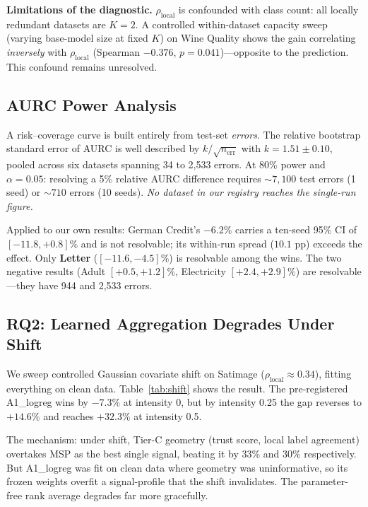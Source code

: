 \documentclass[conference]{IEEEtran}
\newcommand{\rholocal}{\rho_{\mathrm{local}}}
\begin{document}
\textbf{Limitations of the diagnostic.} $\rholocal$ is confounded with class count: all locally redundant datasets are $K{=}2$. A controlled within-dataset capacity sweep (varying base-model size at fixed $K$) on Wine Quality shows the gain correlating \emph{inversely} with $\rholocal$ (Spearman $-0.376$, $p=0.041$)---opposite to the prediction. This confound remains unresolved.

\subsection{AURC Power Analysis}
\label{sec:power}

A risk--coverage curve is built entirely from test-set \emph{errors}. The relative bootstrap standard error of AURC is well described by $k/\sqrt{n_{\mathrm{err}}}$ with $k = 1.51 \pm 0.10$, pooled across six datasets spanning 34 to 2{,}533 errors. At 80\% power and $\alpha{=}0.05$: resolving a 5\% relative AURC difference requires ${\sim}7{,}100$ test errors (1 seed) or ${\sim}710$ errors (10 seeds). \emph{No dataset in our registry reaches the single-run figure.}

Applied to our own results: German Credit's $-6.2\%$ carries a ten-seed 95\% CI of $[-11.8, +0.8]\%$ and is not resolvable; its within-run spread ($10.1$ pp) exceeds the effect. Only \textbf{Letter} ($[-11.6, -4.5]\%$) is resolvable among the wins. The two negative results (Adult $[+0.5, +1.2]\%$, Electricity $[+2.4, +2.9]\%$) are resolvable---they have 944 and 2{,}533 errors.

\subsection{RQ2: Learned Aggregation Degrades Under Shift}
\label{sec:rq2}

We sweep controlled Gaussian covariate shift on Satimage ($\rholocal \approx 0.34$), fitting everything on clean data. Table~\ref{tab:shift} shows the result. The pre-registered A1\_logreg wins by $-7.3\%$ at intensity 0, but by intensity 0.25 the gap reverses to $+14.6\%$ and reaches $+32.3\%$ at intensity 0.5.

The mechanism: under shift, Tier-C geometry (trust score, local label agreement) overtakes MSP as the best single signal, beating it by 33\% and 30\% respectively. But A1\_logreg was fit on clean data where geometry was uninformative, so its frozen weights overfit a signal-profile that the shift invalidates. The parameter-free rank average degrades far more gracefully.
\end{document}

